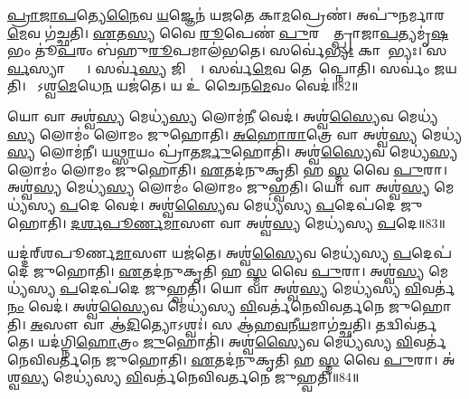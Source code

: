 \ul{𑌪𑍍𑌰𑌾}\ul{𑌜𑌾}\ul{𑌪}𑌤𑍍𑌯𑍇\ul{𑌨𑍈}𑌵 \ul{𑌯}𑌜𑍍𑌞𑍇𑌨॑ 𑌯𑌜𑌤𑍇 𑌕𑌾\ul{𑌮}𑌪𑍍𑌰𑍇𑌣॑।
𑌅𑌪𑍁॑𑌨𑌰𑍍𑌮𑌾𑌰\ul{𑌮𑍇}𑌵 𑌗॑𑌚𑍍𑌛𑌤𑌿।
\ul{𑌏}𑌤\ul{𑌸𑍍𑌯} 𑌵𑍈 \ul{𑌰𑍂}𑌪𑍇𑌣॑ \ul{𑌪𑍁}𑌰𑌸𑍍𑌤𑌾᳚𑌤𑍍𑌪𑍍𑌰𑌾𑌜𑌾\ul{𑌪}𑌤𑍍𑌯𑌮𑍃॑\ul{𑌷}𑌭𑌂 𑌤𑍂॑\ul{𑌪}𑌰𑌂 𑌬॑𑌹𑍁\ul{𑌰𑍂}𑌪𑌮𑌾𑌲॑𑌭𑌤𑍇।
𑌸𑌰𑍍𑌵𑍇॑\ul{𑌭𑍍𑌯𑌃} 𑌕𑌾𑌮𑍇᳚𑌭𑍍𑌯𑌃।
𑌸\ul{𑌰𑍍𑌵}𑌸𑍍𑌯𑌾𑌪𑍍𑌤𑍍𑌯𑍈᳚।
𑌸𑌰𑍍𑌵॑\ul{𑌸𑍍𑌯} 𑌜𑌿𑌤𑍍𑌯𑍈᳚।
𑌸𑌰𑍍𑌵॑\ul{𑌮𑍇}𑌵 𑌤𑍇𑌨𑌾᳚𑌪𑍍𑌨𑍋𑌤𑌿।
𑌸𑌰𑍍𑌵𑌂॑ 𑌜𑌯𑌤𑌿।
𑌯𑍋᳚𑌽𑌶𑍍𑌵\ul{𑌮𑍇}𑌧𑍇\ul{𑌨} 𑌯𑌜॑𑌤𑍇।
𑌯 𑌉॑ 𑌚𑍈𑌨\ul{𑌮𑍇}𑌵𑌂 𑌵𑍇𑌦॑॥82॥\anuvakamend[𑌮𑍇𑌧𑍋\-𑌽𑌭॑\ul{𑌵}𑌦𑍍𑌯𑌜॑𑌤 𑌏\ul{𑌤𑌿} 𑌵𑍇𑌦॑]

𑌯𑍋 𑌵𑌾 𑌅𑌶𑍍𑌵॑\ul{𑌸𑍍𑌯} 𑌮𑍇𑌧𑍍𑌯॑\ul{𑌸𑍍𑌯} 𑌲𑍋𑌮॑\ul{𑌨𑍀} 𑌵𑍇𑌦॑।
𑌅𑌶𑍍𑌵॑\ul{𑌸𑍍𑌯𑍈}𑌵 𑌮𑍇𑌧𑍍𑌯॑\ul{𑌸𑍍𑌯} 𑌲𑍋𑌮𑌂॑ 𑌲𑍋𑌮𑌂 𑌜𑍁𑌹𑍋𑌤𑌿।
\ul{𑌅}\ul{𑌹𑍋}\ul{𑌰𑌾}𑌤𑍍𑌰𑍇 𑌵𑌾 𑌅𑌶𑍍𑌵॑\ul{𑌸𑍍𑌯} 𑌮𑍇𑌧𑍍𑌯॑\ul{𑌸𑍍𑌯} 𑌲𑍋𑌮॑𑌨𑍀।
𑌯\ul{𑌥𑍍𑌸𑌾}𑌯𑌂 𑌪𑍍𑌰𑌾॑𑌤\ul{𑌰𑍍𑌜𑍁}𑌹𑍋𑌤𑌿॑।
𑌅𑌶𑍍𑌵॑\ul{𑌸𑍍𑌯𑍈}𑌵 𑌮𑍇𑌧𑍍𑌯॑\ul{𑌸𑍍𑌯} 𑌲𑍋𑌮𑌂॑ 𑌲𑍋𑌮𑌂 𑌜𑍁𑌹𑍋𑌤𑌿।
\ul{𑌏}𑌤𑌦॑𑌨𑍁𑌕𑍃𑌤𑌿 𑌹 \ul{𑌸𑍍𑌮} 𑌵𑍈 \ul{𑌪𑍁}𑌰𑌾।
𑌅𑌶𑍍𑌵॑\ul{𑌸𑍍𑌯} 𑌮𑍇𑌧𑍍𑌯॑\ul{𑌸𑍍𑌯} 𑌲𑍋𑌮𑌂॑ 𑌲𑍋𑌮𑌂 𑌜𑍁𑌹𑍍𑌵𑌤𑌿।
𑌯𑍋 𑌵𑌾 𑌅𑌶𑍍𑌵॑\ul{𑌸𑍍𑌯} 𑌮𑍇𑌧𑍍𑌯॑𑌸𑍍𑌯 \ul{𑌪}𑌦𑍇 𑌵𑍇𑌦॑।
𑌅𑌶𑍍𑌵॑\ul{𑌸𑍍𑌯𑍈}𑌵 𑌮𑍇𑌧𑍍𑌯॑𑌸𑍍𑌯 \ul{𑌪}𑌦𑍇𑌪॑𑌦𑍇 𑌜𑍁𑌹𑍋𑌤𑌿।
\ul{𑌦}\ul{𑌰𑍍}\ul{𑌶}\ul{𑌪𑍂}\ul{𑌰𑍍𑌣}\ul{𑌮𑌾}𑌸𑍗 𑌵𑌾 𑌅𑌶𑍍𑌵॑\ul{𑌸𑍍𑌯} 𑌮𑍇𑌧𑍍𑌯॑𑌸𑍍𑌯 \ul{𑌪}𑌦𑍇॥83॥

𑌯𑌦𑍍𑌦॑𑌰𑍍‌\mbox{}𑌶𑌪𑍂𑌰𑍍𑌣\ul{𑌮𑌾}𑌸𑍗 𑌯𑌜॑𑌤𑍇।
𑌅𑌶𑍍𑌵॑\ul{𑌸𑍍𑌯𑍈}𑌵 𑌮𑍇𑌧𑍍𑌯॑𑌸𑍍𑌯 \ul{𑌪}𑌦𑍇𑌪॑𑌦𑍇 𑌜𑍁𑌹𑍋𑌤𑌿।
\ul{𑌏}𑌤𑌦॑𑌨𑍁𑌕𑍃𑌤𑌿 𑌹 \ul{𑌸𑍍𑌮} 𑌵𑍈 \ul{𑌪𑍁}𑌰𑌾।
𑌅𑌶𑍍𑌵॑\ul{𑌸𑍍𑌯} 𑌮𑍇𑌧𑍍𑌯॑𑌸𑍍𑌯 \ul{𑌪}𑌦𑍇𑌪॑𑌦𑍇 𑌜𑍁𑌹𑍍𑌵𑌤𑌿।
𑌯𑍋 𑌵𑌾 𑌅𑌶𑍍𑌵॑\ul{𑌸𑍍𑌯} 𑌮𑍇𑌧𑍍𑌯॑𑌸𑍍𑌯 \ul{𑌵𑌿}𑌵𑌰𑍍𑌤॑\ul{𑌨𑌂} 𑌵𑍇𑌦॑।
𑌅𑌶𑍍𑌵॑\ul{𑌸𑍍𑌯𑍈}𑌵 𑌮𑍇𑌧𑍍𑌯॑𑌸𑍍𑌯 \ul{𑌵𑌿}𑌵𑌰𑍍𑌤॑𑌨𑍇𑌵𑌿𑌵𑌰𑍍𑌤𑌨𑍇 𑌜𑍁𑌹𑍋𑌤𑌿।
\ul{𑌅}𑌸𑍗 𑌵𑌾 𑌆॑\ul{𑌦𑌿}𑌤𑍍𑌯𑍋\-𑌽𑌶𑍍𑌵𑌃॑।
𑌸 𑌆॑𑌹\ul{𑌵}𑌨𑍀\ul{𑌯}𑌮𑌾𑌗॑𑌚𑍍𑌛𑌤𑌿।
𑌤𑌦𑍍𑌵𑌿𑌵॑𑌰𑍍𑌤𑌤𑍇।
𑌯𑌦॑𑌗𑍍𑌨𑌿\ul{𑌹𑍋}𑌤𑍍𑌰𑌂 \ul{𑌜𑍁}𑌹𑍋𑌤𑌿॑।
𑌅𑌶𑍍𑌵॑\ul{𑌸𑍍𑌯𑍈}𑌵 𑌮𑍇𑌧𑍍𑌯॑𑌸𑍍𑌯 \ul{𑌵𑌿}𑌵𑌰𑍍𑌤॑𑌨𑍇𑌵𑌿𑌵𑌰𑍍𑌤𑌨𑍇 𑌜𑍁𑌹𑍋𑌤𑌿।
\ul{𑌏}𑌤𑌦॑𑌨𑍁𑌕𑍃𑌤𑌿 𑌹 \ul{𑌸𑍍𑌮} 𑌵𑍈 \ul{𑌪𑍁}𑌰𑌾।
𑌅॑𑌶𑍍𑌵\ul{𑌸𑍍𑌯} 𑌮𑍇𑌧𑍍𑌯॑𑌸𑍍𑌯 \ul{𑌵𑌿}𑌵𑌰𑍍𑌤॑𑌨𑍇𑌵𑌿𑌵𑌰𑍍𑌤𑌨𑍇 𑌜𑍁𑌹𑍍𑌵𑌤𑌿॥84॥\anuvakamend[\ul{𑌪}𑌦𑍇 𑌅॑𑌗𑍍𑌨𑌿\ul{𑌹𑍋}𑌤𑍍𑌰𑌂 \ul{𑌜𑍁}𑌹𑍋\ul{𑌤𑌿} 𑌤𑍍𑌰𑍀𑌣𑌿॑ 𑌚]

\clearpage

